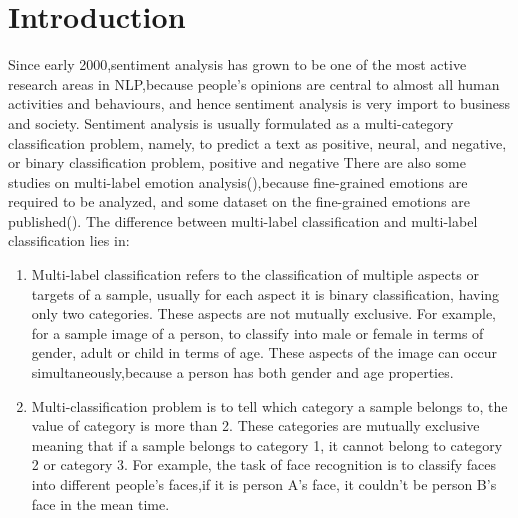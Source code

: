 \documentclass[12pt,twocolumn,letterpaper]{article}
\begin{document}
\section{Introduction}
Since early 2000,sentiment analysis has grown to be one of the most active research areas in NLP,because people’s opinions are central to almost all human activities and behaviours, and hence sentiment analysis is very import to business and society. 
Sentiment analysis is usually formulated as a multi-category classification problem, namely, to predict a text as positive, neural, and negative, or binary classification problem, positive and negative
There are also some studies on multi-label emotion analysis(\cite{Ref2}),because fine-grained emotions are required to be analyzed, and some dataset on the fine-grained emotions are published(\cite{Ref1}).
The difference between multi-label classification and multi-label classification lies in:  
\begin{enumerate}
\item Multi-label classification refers to the classification of multiple aspects or targets of a sample, usually for each aspect it is binary classification, having only two categories. These aspects are not mutually exclusive. For example, for a sample image of a person, to classify into male or female in terms of gender, adult or child in terms of age. These aspects of the image can occur simultaneously,because a person has both gender and age properties.  
\item Multi-classification problem is to tell which category a sample belongs to, the value of category is more than 2. These categories are mutually exclusive meaning that if a sample belongs to category 1, it cannot belong to category 2 or category 3. For example, the task of face recognition is to classify faces into different people's faces,if it is person A's face, it couldn't be person B's face in the mean time.  
\end{enumerate}
\end{document}
